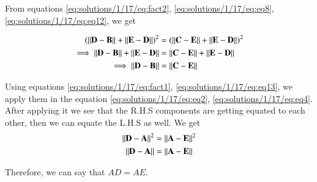 	From equations \eqref{eq:solutions/1/17/eq:fact2}, \eqref{eq:solutions/1/17/eq:eq8}, \eqref{eq:solutions/1/17/eq:eq12}, we get
	
	\begin{align}\label{eq:solutions/1/17/eq:eq13}
		\left(\left\lVert\mathbf{D}-\mathbf{B}\right\rVert + \left\lVert\mathbf{E}-\mathbf{D}\right\rVert\right)^{2} &= \left(\left\lVert\mathbf{C}-\mathbf{E}\right\rVert + \left\lVert\mathbf{E}-\mathbf{D}\right\rVert\right)^{2} \nonumber \\
		\implies \left\lVert\mathbf{D}-\mathbf{B}\right\rVert + \left\lVert\mathbf{E}-\mathbf{D}\right\rVert &= \left\lVert\mathbf{C}-\mathbf{E}\right\rVert + \left\lVert\mathbf{E}-\mathbf{D}\right\rVert \nonumber \\
		\implies \left\lVert\mathbf{D}-\mathbf{B}\right\rVert &= \left\lVert\mathbf{C}-\mathbf{E}\right\rVert
	\end{align}

	Using equations \eqref{eq:solutions/1/17/eq:fact1}, \eqref{eq:solutions/1/17/eq:eq13}, we apply them in the equation \eqref{eq:solutions/1/17/eq:eq2}, \eqref{eq:solutions/1/17/eq:eq4}. After applying it we see that the R.H.S components are getting equated to each other, then we can equate the L.H.S as well. We get 
	\begin{align}\label{eq:solutions/1/17/eq:eq15}
		\left\lVert\mathbf{D}-\mathbf{A}\right\rVert^{2} &= \left\lVert\mathbf{A}-\mathbf{E}\right\rVert^{2} \nonumber \\
		\left\lVert\mathbf{D}-\mathbf{A}\right\rVert &= \left\lVert\mathbf{A}-\mathbf{E}\right\rVert
	\end{align}
	
	Therefore, we can say that $AD = AE$.
	
